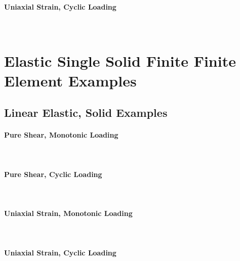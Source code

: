 \documentclass[fleqn,11pt]{article}
\begin{document}
\paragraph{Uniaxial Strain, Cyclic Loading} ~




\section{Elastic Single Solid Finite Finite Element Examples}

\subsection{Linear Elastic, Solid Examples}


\paragraph{Pure Shear, Monotonic Loading} ~

\paragraph{Pure Shear, Cyclic Loading} ~


\paragraph{Uniaxial Strain, Monotonic Loading} ~

\paragraph{Uniaxial Strain, Cyclic Loading} ~
\end{document}
